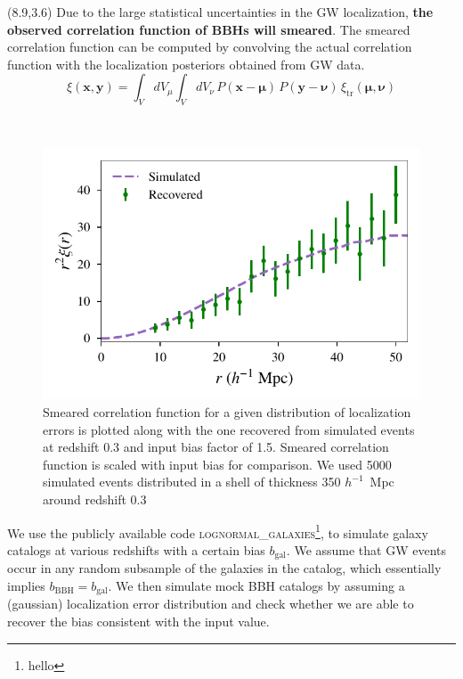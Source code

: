 \documentclass[a1,portrait]{a1poster}
\newcommand{\headingcolor}{\color{BannerElevenColor}}
\newcommand{\x}{\mathbf{x}}
\newcommand{\y}{\mathbf{y}}
\newcommand{\xit}{\xi_\mathrm{tr}}
\newcommand{\bmu}{\bm \mu}
\newcommand{\bnu}{\bm \nu}
\def\LHead#1{\noindent{\LARGE \headingcolor #1}\smallskip}
\begin{document}
\begin{textblock}{7.3}(8.9,3.6)	%
\vspace{2cm}
Due to the large statistical uncertainties in the GW localization, \textbf{the observed correlation function of BBHs will smeared}. The smeared correlation function can be computed by convolving the actual correlation function with the localization posteriors obtained from GW data.
\begin{equation}
\xi(\x, \y) = \int_V dV_\mu \int_V dV_\nu \,  P(\x-\bmu) \, P(\y-\bnu) \, \xit(\bmu, \bnu)
\label{eq:xi_v2}
\end{equation}

\LHead{Simulations and Results}\\
\begin{figure}[t]
	\centering
	\includegraphics[scale=1.8]{comparison_data_expected.pdf}
	\caption{\small{Smeared correlation function for a given distribution of localization errors is plotted along with the one recovered from simulated events at redshift 0.3 and input bias factor of 1.5. Smeared correlation function is scaled with input bias for comparison. We used 5000 simulated events distributed in a shell of thickness 350 $h^{-1}$~Mpc around redshift $0.3$} }
	\label{fig:simulation_example}
\end{figure}
We use the publicly available code \textsc{lognormal\_galaxies}\footnote{hello}, to simulate galaxy catalogs at various redshifts with a certain bias $ b_\mathrm{gal} $. We assume that GW events occur in any random subsample of the galaxies in the catalog, which essentially implies $b_\mathrm{BBH}=b_\mathrm{gal}$. We then simulate mock BBH catalogs by assuming a (gaussian) localization error distribution and check whether we are able to recover the bias consistent with the input value.\\


\end{textblock}
\end{document}
